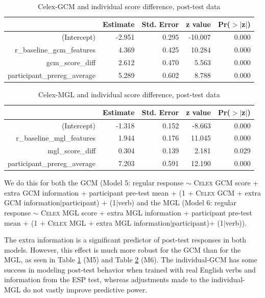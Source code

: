 \documentclass[12pt]{article}
\begin{document}
\begin{table}[ht]
\centering
\begin{tabular}{rrrrr}
  \hline
 & Estimate & Std. Error & z value & Pr($>$$|$z$|$) \\ 
  \hline
(Intercept) & -2.951 & 0.295 & -10.007 & 0.000 \\ 
  r\_baseline\_gcm\_features & 4.369 & 0.425 & 10.284 & 0.000 \\ 
  gcm\_score\_diff & 2.612 & 0.470 & 5.563 & 0.000 \\ 
  participant\_prereg\_average & 5.289 & 0.602 & 8.788 & 0.000 \\ 
   \hline
\end{tabular}
\caption{Celex-GCM and individual score difference, post-test data} 
\label{indiv1}
\end{table}
\begin{table}[ht]
\centering
\begin{tabular}{rrrrr}
  \hline
 & Estimate & Std. Error & z value & Pr($>$$|$z$|$) \\ 
  \hline
(Intercept) & -1.318 & 0.152 & -8.663 & 0.000 \\ 
  r\_baseline\_mgl\_features & 1.944 & 0.176 & 11.045 & 0.000 \\ 
  mgl\_score\_diff & 0.304 & 0.139 & 2.181 & 0.029 \\ 
  participant\_prereg\_average & 7.203 & 0.591 & 12.190 & 0.000 \\ 
   \hline
\end{tabular}
\caption{Celex-MGL and individual score difference, post-test data} 
\label{indiv2}
\end{table}
We do this for both the GCM  (Model 5: regular response  $\sim$ \textsc{Celex} GCM score + extra GCM information + participant pre-test mean + (1 + \textsc{Celex} GCM + extra GCM information$|$participant) + (1$|$verb) and the MGL (Model 6: regular response  $\sim$ \textsc{Celex} MGL score + extra MGL information + participant pre-test mean + (1 + \textsc{Celex} MGL + extra MGL information$|$participant)+ (1$|$verb)).

The extra information is a significant predictor of post-test responses in both models. However, this effect is much more robust for the GCM than for the MGL, as seen in Table \ref{indiv1} (M5) and Table \ref{indiv2} (M6). The individual-GCM has some success in modeling post-test behavior when trained with real English verbs and information from the ESP test, whereas adjustments made to the individual-MGL do not vastly improve predictive power. 
\end{document}
